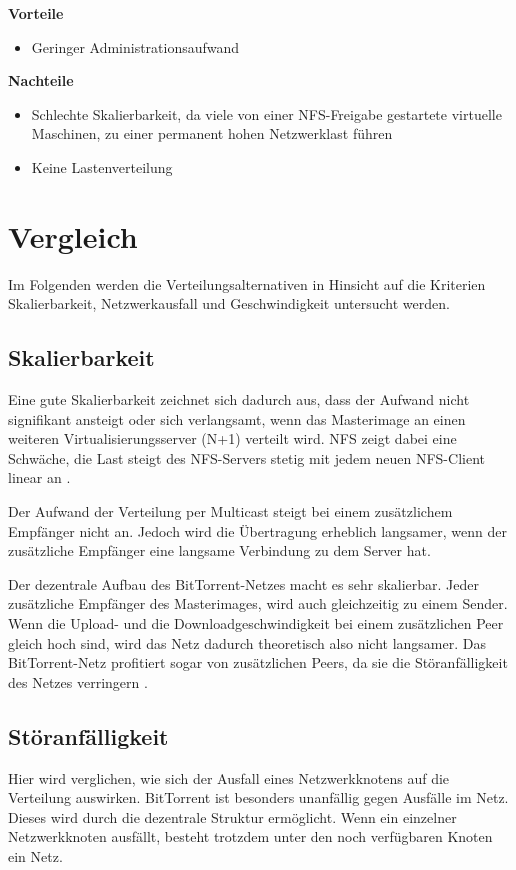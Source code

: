 
\textbf{Vorteile}
\begin{itemize}
 \item Geringer Administrationsaufwand
\end{itemize}

\textbf{Nachteile}
\begin{itemize}
 \item Schlechte Skalierbarkeit, da viele von einer NFS-Freigabe gestartete virtuelle Maschinen, zu einer permanent hohen Netzwerklast führen
 \item Keine Lastenverteilung
\end{itemize}

\section{Vergleich}
Im Folgenden werden die Verteilungsalternativen in Hinsicht auf die Kriterien Skalierbarkeit, Netzwerkausfall und Geschwindigkeit untersucht werden.

\subsection{Skalierbarkeit}
Eine gute Skalierbarkeit zeichnet sich dadurch aus, dass der Aufwand nicht signifikant ansteigt oder sich verlangsamt, wenn das Masterimage an einen weiteren Virtualisierungsserver (N+1) verteilt wird. NFS zeigt dabei eine Schwäche, die Last steigt des NFS-Servers stetig mit jedem neuen NFS-Client linear an \cite{nfsharmful}. 

Der Aufwand der Verteilung per Multicast steigt bei einem zusätzlichem Empfänger nicht an. Jedoch wird die Übertragung erheblich langsamer, wenn der zusätzliche Empfänger eine langsame Verbindung zu dem Server hat. 

Der dezentrale Aufbau des BitTorrent-Netzes macht es sehr skalierbar. Jeder zusätzliche Empfänger des Masterimages, wird auch gleichzeitig zu einem Sender. Wenn die Upload- und die Downloadgeschwindigkeit bei einem zusätzlichen Peer gleich hoch sind, wird das Netz dadurch theoretisch also nicht langsamer. Das BitTorrent-Netz profitiert sogar von zusätzlichen Peers, da sie die Störanfälligkeit des Netzes verringern \cite{btscalability}.

\subsection{Störanfälligkeit}
Hier wird verglichen, wie sich der Ausfall eines Netzwerkknotens auf die Verteilung auswirken. BitTorrent ist besonders unanfällig gegen Ausfälle im Netz. Dieses wird durch die dezentrale Struktur ermöglicht. Wenn ein einzelner Netzwerkknoten ausfällt, besteht trotzdem unter den noch verfügbaren Knoten ein Netz. 

